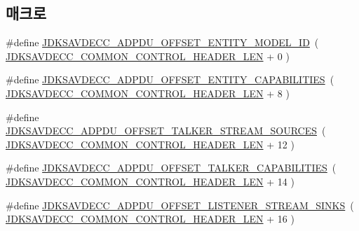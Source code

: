 \subsection*{매크로}
\begin{DoxyCompactItemize}
\item 
\#define \hyperlink{group__adpdu_ga96883aa53d14212ddf4776937800de98}{J\+D\+K\+S\+A\+V\+D\+E\+C\+C\+\_\+\+A\+D\+P\+D\+U\+\_\+\+O\+F\+F\+S\+E\+T\+\_\+\+E\+N\+T\+I\+T\+Y\+\_\+\+M\+O\+D\+E\+L\+\_\+\+ID}~( \hyperlink{group__jdksavdecc__avtp__common__control__header_gaae84052886fb1bb42f3bc5f85b741dff}{J\+D\+K\+S\+A\+V\+D\+E\+C\+C\+\_\+\+C\+O\+M\+M\+O\+N\+\_\+\+C\+O\+N\+T\+R\+O\+L\+\_\+\+H\+E\+A\+D\+E\+R\+\_\+\+L\+EN} + 0 )
\item 
\#define \hyperlink{group__adpdu_ga64916f3e366ac74db3b1ae663838c550}{J\+D\+K\+S\+A\+V\+D\+E\+C\+C\+\_\+\+A\+D\+P\+D\+U\+\_\+\+O\+F\+F\+S\+E\+T\+\_\+\+E\+N\+T\+I\+T\+Y\+\_\+\+C\+A\+P\+A\+B\+I\+L\+I\+T\+I\+ES}~( \hyperlink{group__jdksavdecc__avtp__common__control__header_gaae84052886fb1bb42f3bc5f85b741dff}{J\+D\+K\+S\+A\+V\+D\+E\+C\+C\+\_\+\+C\+O\+M\+M\+O\+N\+\_\+\+C\+O\+N\+T\+R\+O\+L\+\_\+\+H\+E\+A\+D\+E\+R\+\_\+\+L\+EN} + 8 )
\item 
\#define \hyperlink{group__adpdu_ga45a657e4509e4e723eb0fd534c77c759}{J\+D\+K\+S\+A\+V\+D\+E\+C\+C\+\_\+\+A\+D\+P\+D\+U\+\_\+\+O\+F\+F\+S\+E\+T\+\_\+\+T\+A\+L\+K\+E\+R\+\_\+\+S\+T\+R\+E\+A\+M\+\_\+\+S\+O\+U\+R\+C\+ES}~( \hyperlink{group__jdksavdecc__avtp__common__control__header_gaae84052886fb1bb42f3bc5f85b741dff}{J\+D\+K\+S\+A\+V\+D\+E\+C\+C\+\_\+\+C\+O\+M\+M\+O\+N\+\_\+\+C\+O\+N\+T\+R\+O\+L\+\_\+\+H\+E\+A\+D\+E\+R\+\_\+\+L\+EN} + 12 )
\item 
\#define \hyperlink{group__adpdu_ga88eac0707b6fbe726fe22c974d35f0fe}{J\+D\+K\+S\+A\+V\+D\+E\+C\+C\+\_\+\+A\+D\+P\+D\+U\+\_\+\+O\+F\+F\+S\+E\+T\+\_\+\+T\+A\+L\+K\+E\+R\+\_\+\+C\+A\+P\+A\+B\+I\+L\+I\+T\+I\+ES}~( \hyperlink{group__jdksavdecc__avtp__common__control__header_gaae84052886fb1bb42f3bc5f85b741dff}{J\+D\+K\+S\+A\+V\+D\+E\+C\+C\+\_\+\+C\+O\+M\+M\+O\+N\+\_\+\+C\+O\+N\+T\+R\+O\+L\+\_\+\+H\+E\+A\+D\+E\+R\+\_\+\+L\+EN} + 14 )
\item 
\#define \hyperlink{group__adpdu_ga5b292150cb57a8e2ed51e1fc2f1e39ea}{J\+D\+K\+S\+A\+V\+D\+E\+C\+C\+\_\+\+A\+D\+P\+D\+U\+\_\+\+O\+F\+F\+S\+E\+T\+\_\+\+L\+I\+S\+T\+E\+N\+E\+R\+\_\+\+S\+T\+R\+E\+A\+M\+\_\+\+S\+I\+N\+KS}~( \hyperlink{group__jdksavdecc__avtp__common__control__header_gaae84052886fb1bb42f3bc5f85b741dff}{J\+D\+K\+S\+A\+V\+D\+E\+C\+C\+\_\+\+C\+O\+M\+M\+O\+N\+\_\+\+C\+O\+N\+T\+R\+O\+L\+\_\+\+H\+E\+A\+D\+E\+R\+\_\+\+L\+EN} + 16 )

\end{DoxyCompactItemize}
